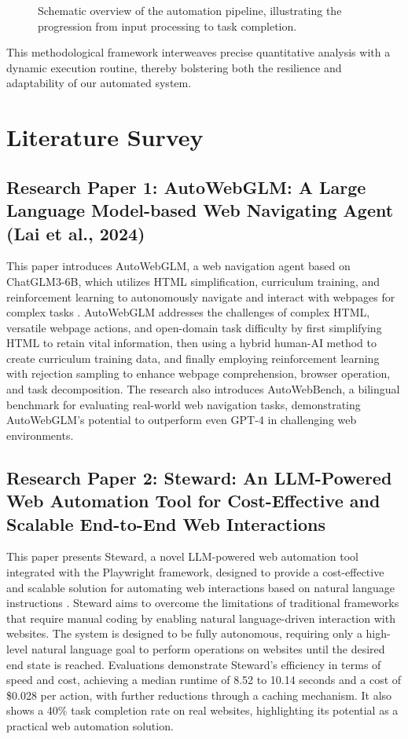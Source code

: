 \documentclass[conference]{IEEEtran}
\begin{document}
\begin{figure}[ht]
\centering
\caption{Schematic overview of the automation pipeline, illustrating the progression from input processing to task completion.}
\label{fig:flowchart}
\end{figure}

This methodological framework interweaves precise quantitative analysis with a dynamic execution routine, thereby bolstering both the resilience and adaptability of our automated system.
\section{Literature Survey}

\subsection{Research Paper 1: AutoWebGLM: A Large Language Model-based Web Navigating Agent (Lai et al., 2024)}
This paper introduces AutoWebGLM, a web navigation agent based on ChatGLM3-6B, which utilizes HTML simplification, curriculum training, and reinforcement learning to autonomously navigate and interact with webpages for complex tasks \cite{lai2024autowebglm}. AutoWebGLM addresses the challenges of complex HTML, versatile webpage actions, and open-domain task difficulty by first simplifying HTML to retain vital information, then using a hybrid human-AI method to create curriculum training data, and finally employing reinforcement learning with rejection sampling to enhance webpage comprehension, browser operation, and task decomposition. The research also introduces AutoWebBench, a bilingual benchmark for evaluating real-world web navigation tasks, demonstrating AutoWebGLM's potential to outperform even GPT-4 in challenging web environments.

\subsection{Research Paper 2: Steward: An LLM-Powered Web Automation Tool for Cost-Effective and Scalable End-to-End Web Interactions}
This paper presents Steward, a novel LLM-powered web automation tool integrated with the Playwright framework, designed to provide a cost-effective and scalable solution for automating web interactions based on natural language instructions \cite{steward2024}. Steward aims to overcome the limitations of traditional frameworks that require manual coding by enabling natural language-driven interaction with websites. The system is designed to be fully autonomous, requiring only a high-level natural language goal to perform operations on websites until the desired end state is reached. Evaluations demonstrate Steward's efficiency in terms of speed and cost, achieving a median runtime of 8.52 to 10.14 seconds and a cost of \$0.028 per action, with further reductions through a caching mechanism. It also shows a 40\% task completion rate on real websites, highlighting its potential as a practical web automation solution.
\end{document}
